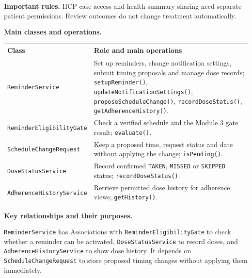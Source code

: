 \noindent\textbf{Important rules.} HCP case access and health-summary sharing
need separate patient permissions. Review outcomes do not change treatment
automatically.



\noindent\textbf{Main classes and operations.}\par\smallskip
\begingroup\small
\noindent\begin{tabularx}{\textwidth}{|L{0.37\textwidth}|Y|}
\hline
\textbf{Class} & \textbf{Role and main operations} \\ \hline
\texttt{ReminderService} & Set up reminders, change notification settings, submit timing proposals and manage dose records; \texttt{setupReminder()}, \texttt{updateNotificationSettings()}, \texttt{proposeScheduleChange()}, \texttt{recordDoseStatus()}, \texttt{getAdherenceHistory()}. \\ \hline
\texttt{ReminderEligibilityGate} & Check a verified schedule and the Module 3 gate result; \texttt{evaluate()}. \\ \hline
\texttt{ScheduleChangeRequest} & Keep a proposed time, request status and date without applying the change; \texttt{isPending()}. \\ \hline
\texttt{DoseStatusService} & Record confirmed \texttt{TAKEN}, \texttt{MISSED} or \texttt{SKIPPED} status; \texttt{recordDoseStatus()}. \\ \hline
\texttt{AdherenceHistoryService} & Retrieve permitted dose history for adherence views; \texttt{getHistory()}. \\ \hline
\end{tabularx}\par
\endgroup

\noindent\textbf{Key relationships and their purposes.}\par\smallskip
\texttt{ReminderService} has Associations with
\texttt{ReminderEligibilityGate} to check whether a reminder can be
activated, \texttt{DoseStatusService} to record doses, and
\texttt{AdherenceHistoryService} to show dose history. It depends on
\texttt{ScheduleChangeRequest} to store proposed timing changes without
applying them immediately.

